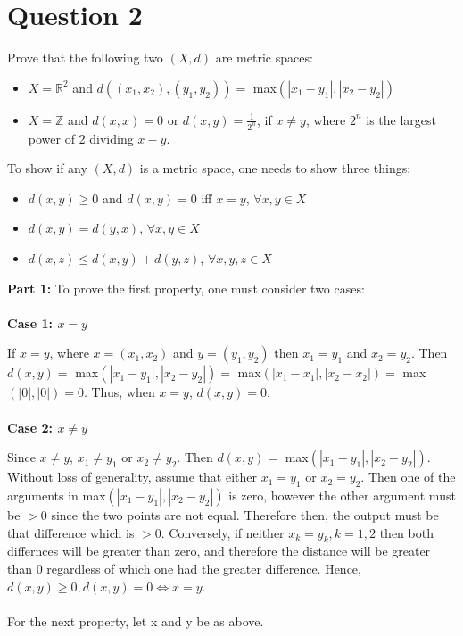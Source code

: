 \documentclass[12pt, letterpaper]{article}
\begin{document}
\section*{Question 2}
Prove that the following two $(X, d)$ are metric spaces:
\begin{itemize}
    \item $X = \mathbb{R}^2$ and $d((x_1, x_2), (y_1, y_2)) =$ max$(|x_1 - y_1|, |x_2 - y_2|)$
    \item $X = \mathbb{Z}$ and $d(x, x) = 0$ or $d(x, y) = \frac{1}{2^n}$, if $x \neq y$, where $2^n$ is the largest power of 2 dividing $x - y$.
\end{itemize}
To show if any $(X, d)$ is a metric space, one needs to show three things:
\begin{itemize}
    \item $d(x, y) \geq 0$ and $d(x, y) = 0$ iff $x = y$, $\forall x, y \in X$
    \item $d(x, y) = d(y, x)$, $\forall x, y \in X$
    \item $d(x, z) \leq d(x, y) + d(y, z)$, $\forall x, y, z \in X$
\end{itemize}
\textbf{Part 1:}
To prove the first property, one must consider two cases:\\
\\
\noindent\textbf{Case 1: $x = y$}

\noindent If $x = y$, where $x = (x_1, x_2)$ and $y = (y_1, y_2)$ then $x_1 = y_1$ and $x_2 = y_2$. Then $d(x, y) = $ max$(|x_1 - y_1|, |x_2 - y_2|) = $
max$(|x_1 - x_1|, |x_2 - x_2|) = $ max$(|0|, |0|) = 0$. Thus, when $x = y$, $d(x, y) = 0$.\\
\\
\noindent\textbf{Case 2: $x \neq y$}

\noindent Since $x \neq y$, $x_1 \neq y_1$ or $x_2 \neq y_2$. Then $d(x, y) = $ max$(|x_1 - y_1|, |x_2 - y_2|)$. Without loss of generality, assume that either $x_1 = y_1$ or $x_2 = y_2$.
Then one of the arguments in max$(|x_1 - y_1|, |x_2 - y_2|)$ is zero, however the other argument must be $> 0$ since the two points are not equal. Therefore then, the output must be that difference which is $> 0$.
Conversely, if neither $x_k = y_k, k = 1, 2$ then both differnces will be greater than zero, and therefore the distance will be greater than 0 regardless of which one had the greater difference.
Hence, $d(x, y) \geq 0, d(x, y) = 0 \iff x = y$.\\
\\
For the next property, let x and y be as above.\\
\end{document}

